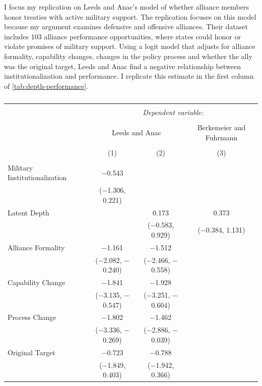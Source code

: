 \documentclass[12pt]{article}
\begin{document}
I focus my replication on Leeds and Anac's model of whether alliance members honor treaties with active military support. 
The replication focuses on this model because my argument examines defensive and offensive alliances. 
Their dataset includes 103 alliance performance opportunities, where states could honor or violate promises of military support. 
Using a logit model that adjusts for alliance formality, capability changes, changes in the policy process and whether the ally was the original target, Leeds and Anac find a negative relationship between institutionalization and performance. 
I replicate this estimate in the first column of \autoref{tab:depth-performance}. 


\begin{table}[!htbp] \centering 
  \caption{} 
  \label{tab:depth-performance} 
\begin{adjustbox}{width= .95\textwidth, center}
\begin{tabular}{@{\extracolsep{5pt}}lccc} 
\\[-1.8ex]\hline 
\hline \\[-1.8ex] 
 & \multicolumn{3}{c}{\textit{Dependent variable:}} \\ 
\cline{2-4} 
\\[-1.8ex] & \multicolumn{2}{c}{Leeds and Anac} & Berkemeier and Fuhrmann \\ 
\\[-1.8ex] & (1) & (2) & (3)\\ 
\hline \\[-1.8ex] 
 Military Institutionalization & $-$0.543 &  &  \\ 
  & ($-$1.306, 0.221) &  &  \\ 
  Latent Depth &  & 0.173 & 0.373 \\ 
  &  & ($-$0.583, 0.929) & ($-$0.384, 1.131) \\ 
  Alliance Formality & $-$1.161$^{}$ & $-$1.512$^{}$ &  \\ 
  & ($-$2.082, $-$0.240) & ($-$2.466, $-$0.558) &  \\ 
  Capability Change & $-$1.841$^{}$ & $-$1.928$^{}$ &  \\ 
  & ($-$3.135, $-$0.547) & ($-$3.251, $-$0.604) &  \\ 
  Process Change & $-$1.802$^{}$ & $-$1.462$^{}$ &  \\ 
  & ($-$3.336, $-$0.269) & ($-$2.886, $-$0.039) &  \\ 
  Original Target & $-$0.723 & $-$0.788 &  \\ 
  & ($-$1.849, 0.403) & ($-$1.942, 0.366) &  \\ 

\end{tabular}
\end{adjustbox}
\end{table}
\end{document}
